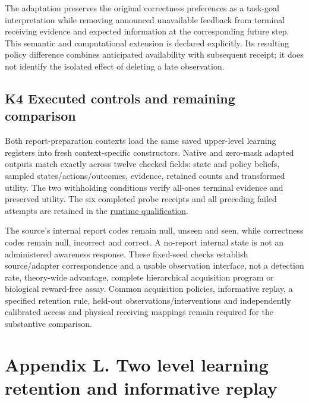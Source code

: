 \documentclass[
  american,
  11pt,
  letterpaper,
]{article}
\begin{document}
The adaptation preserves the original correctness preferences as a task-goal interpretation while removing announced unavailable feedback from terminal receiving evidence and expected information at the corresponding future step. This semantic and computational extension is declared explicitly. Its resulting policy difference combines anticipated availability with subsequent receipt; it does not identify the isolated effect of deleting a late observation.

\subsection{K4 Executed controls and remaining comparison}\label{k4-executed-controls-and-remaining-comparison}

Both report-preparation contexts load the same saved upper-level learning registers into fresh context-specific constructors. Native and zero-mask adapted outputs match exactly across twelve checked fields: state and policy beliefs, sampled states/actions/outcomes, evidence, retained counts and transformed utility. The two withholding conditions verify all-ones terminal evidence and preserved utility. The six completed probe receipts and all preceding failed attempts are retained in the \href{https://github.com/v5ma/v5ma.github.io/blob/master/papers/companions/learning-to-feel-v1.0/ARTIFACT-AVAILABILITY.md#artifact-39}{runtime qualification}.

The source's internal report codes remain null, unseen and seen, while correctness codes remain null, incorrect and correct. A no-report internal state is not an administered awareness response. These fixed-seed checks establish source/adapter correspondence and a usable observation interface, not a detection rate, theory-wide advantage, complete hierarchical acquisition program or biological reward-free assay. Common acquisition policies, informative replay, a specified retention rule, held-out observations/interventions and independently calibrated access and physical receiving mappings remain required for the substantive comparison.

\clearpage
\hypertarget{appendix-l}{}

\section{Appendix L. Two level learning retention and informative replay}\label{appendix-l.-two-level-learning-retention-and-informative-replay}
\end{document}
